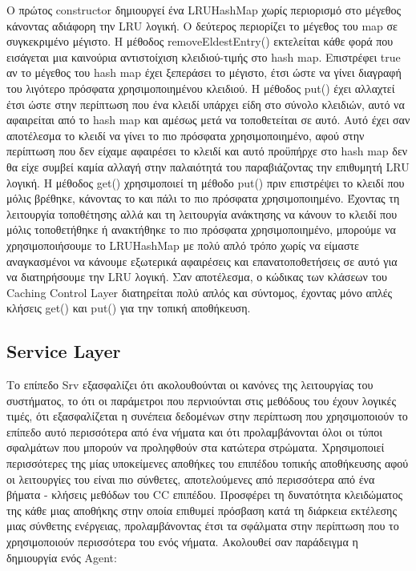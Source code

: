 \documentclass[a4paper,11pt]{article}
\begin{document}
\begin{sloppypar}
Ο πρώτος constructor δημιουργεί ένα LRUHashMap χωρίς περιορισμό στο μέγεθος κάνοντας αδιάφορη την LRU λογική. Ο δεύτερος περιορίζει το μέγεθος του map σε συγκεκριμένο μέγιστο. Η μέθοδος removeEldestEntry() εκτελείται κάθε φορά που εισάγεται μια καινούρια αντιστοίχιση κλειδιού-τιμής στο hash map. Επιστρέφει true αν το μέγεθος του hash map έχει ξεπεράσει το μέγιστο, έτσι ώστε να γίνει διαγραφή του λιγότερο πρόσφατα χρησιμοποιημένου κλειδιού. Η μέθοδος put() έχει αλλαχτεί έτσι ώστε στην περίπτωση που ένα κλειδί υπάρχει είδη στο σύνολο κλειδιών, αυτό να αφαιρείται από το hash map και αμέσως μετά να τοποθετείται σε αυτό. Αυτό έχει σαν αποτέλεσμα το κλειδί να γίνει το πιο πρόσφατα χρησιμοποιημένο, αφού στην περίπτωση που δεν είχαμε αφαιρέσει το κλειδί και αυτό προϋπήρχε στο hash map δεν θα είχε συμβεί καμία αλλαγή στην παλαιότητά του παραβιάζοντας την επιθυμητή LRU λογική. Η μέθοδος get() χρησιμοποιεί τη μέθοδο put() πριν επιστρέψει το κλειδί που μόλις βρέθηκε, κάνοντας το και πάλι το πιο πρόσφατα χρησιμοποιημένο. Έχοντας τη λειτουργία τοποθέτησης αλλά και τη λειτουργία ανάκτησης να κάνουν το κλειδί που μόλις τοποθετήθηκε ή ανακτήθηκε το πιο πρόσφατα χρησιμοποιημένο, μπορούμε να χρησιμοποιήσουμε το LRUHashMap με πολύ απλό τρόπο χωρίς να είμαστε αναγκασμένοι να κάνουμε εξωτερικά αφαιρέσεις και επανατοποθετήσεις σε αυτό για να διατηρήσουμε την LRU λογική. Σαν αποτέλεσμα, ο κώδικας των κλάσεων του Caching Control Layer διατηρείται πολύ απλός και σύντομος, έχοντας μόνο απλές κλήσεις get() και put() για την τοπική αποθήκευση.

\newpage


\subsection{Service Layer}

Το επίπεδο Srv εξασφαλίζει ότι ακολουθούνται οι κανόνες της λειτουργίας του συστήματος, το ότι οι παράμετροι που περνιούνται στις μεθόδους του έχουν λογικές τιμές, ότι εξασφαλίζεται η συνέπεια δεδομένων στην περίπτωση που χρησιμοποιούν το επίπεδο αυτό περισσότερα από ένα νήματα και ότι προλαμβάνονται όλοι οι τύποι σφαλμάτων που μπορούν να προληφθούν στα κατώτερα στρώματα.
Χρησιμοποιεί περισσότερες της μίας υποκείμενες αποθήκες του επιπέδου τοπικής αποθήκευσης αφού οι λειτουργίες του είναι πιο σύνθετες, αποτελούμενες από περισσότερα από ένα βήματα - κλήσεις μεθόδων του CC επιπέδου. Προσφέρει τη δυνατότητα κλειδώματος της κάθε μιας αποθήκης στην οποία επιθυμεί πρόσβαση κατά τη διάρκεια εκτέλεσης μιας σύνθετης ενέργειας, προλαμβάνοντας έτσι τα σφάλματα στην περίπτωση που το χρησιμοποιούν περισσότερα του ενός νήματα.
Ακολουθεί σαν παράδειγμα η δημιουργία ενός Agent:


\end{sloppypar}
\end{document}

